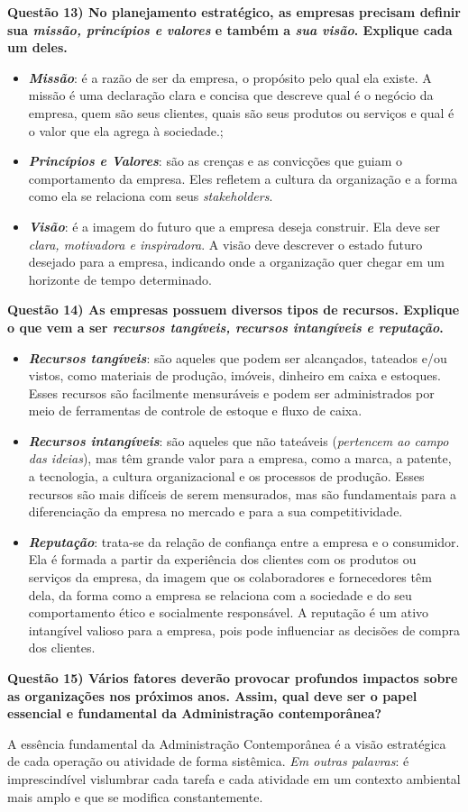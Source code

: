\documentclass{article}
\begin{document}
\noindent \textbf{Questão 13) No planejamento estratégico, as empresas precisam definir sua \emph{missão, princípios e valores} e também a \emph{sua visão}. Explique cada um deles.}
\begin{itemize}
    \item \textbf{\emph{Missão}}: é a razão de ser da empresa, o propósito pelo qual ela existe. A missão é uma declaração clara e concisa que descreve qual é o negócio da empresa, quem são seus clientes, quais são seus produtos ou serviços e qual é o valor que ela agrega à sociedade.;
    \item \textbf{\emph{Princípios e Valores}}: são as crenças e as convicções que guiam o comportamento da empresa. Eles refletem a cultura da organização e a forma como ela se relaciona com seus \emph{stakeholders}.
    \item \textbf{\emph{Visão}}: é a imagem do futuro que a empresa deseja construir. Ela deve ser \emph{clara, motivadora e inspiradora}. A visão deve descrever o estado futuro desejado para a empresa, indicando onde a organização quer chegar em um horizonte de tempo determinado.
\end{itemize}

\noindent \textbf{Questão 14) As empresas possuem diversos tipos de recursos. Explique o que vem a ser \emph{recursos tangíveis, recursos intangíveis e reputação}.}
\begin{itemize}
    \item \textbf{\emph{Recursos tangíveis}}: são aqueles que podem ser alcançados, tateados e/ou vistos, como materiais de produção, imóveis, dinheiro em caixa e estoques. Esses recursos são facilmente mensuráveis e podem ser administrados por meio de ferramentas de controle de estoque e fluxo de caixa.
    \item \textbf{\emph{Recursos intangíveis}}: são aqueles que não tateáveis (\emph{pertencem ao campo das ideias}), mas têm grande valor para a empresa, como a marca, a patente, a tecnologia, a cultura organizacional e os processos de produção. Esses recursos são mais difíceis de serem mensurados, mas são fundamentais para a diferenciação da empresa no mercado e para a sua competitividade.
    \item \textbf{\emph{Reputação}}: trata-se da relação de confiança entre a empresa e o consumidor. Ela é formada a partir da experiência dos clientes com os produtos ou serviços da empresa, da imagem que os colaboradores e fornecedores têm dela, da forma como a empresa se relaciona com a sociedade e do seu comportamento ético e socialmente responsável. A reputação é um ativo intangível valioso para a empresa, pois pode influenciar as decisões de compra dos clientes.
\end{itemize}

\noindent \textbf{Questão 15) Vários fatores deverão provocar profundos impactos sobre as organizações nos próximos anos. Assim, qual deve ser o papel essencial e fundamental da Administração contemporânea?}
\par A essência fundamental da Administração Contemporânea é a visão estratégica de cada operação ou atividade de forma sistêmica. \emph{Em outras palavras}: é imprescindível vislumbrar cada tarefa e cada atividade em um contexto ambiental mais amplo e que se modifica constantemente.
\end{document}
